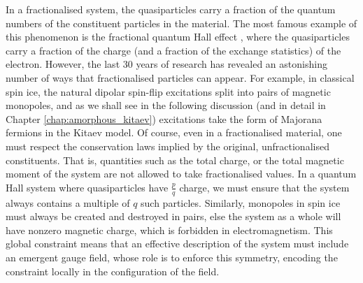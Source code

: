 In a fractionalised system, the quasiparticles carry a fraction of the quantum numbers of the constituent particles in the material. The most famous example of this phenomenon is the fractional quantum Hall effect \cite{laughlin_nobel_1999}, where the quasiparticles carry a fraction of the charge (and a fraction of the exchange statistics) of the electron. However, the last 30 years of research has revealed an astonishing number of ways that fractionalised particles can appear. For example, in classical spin ice, the natural dipolar spin-flip excitations split into pairs of magnetic monopoles, and as we shall see in the following discussion (and in detail in Chapter \ref{chap:amorphous_kitaev}) excitations take the form of Majorana fermions in the Kitaev model. Of course, even in a fractionalised material, one must respect the conservation laws implied by the original, unfractionalised constituents. That is, quantities such as the total charge, or the total magnetic moment of the system are not allowed to take fractionalised values. In a quantum Hall system where quasiparticles have $\frac pq$ charge, we must ensure that the system always contains a multiple of $q$ such particles. Similarly, monopoles in spin ice must always be created and destroyed in pairs, else the system as a whole will have nonzero magnetic charge, which is forbidden in electromagnetism. This global constraint means that an effective description of the system must include an emergent gauge field, whose role is to enforce this symmetry, encoding the constraint locally in the configuration of the field. 

